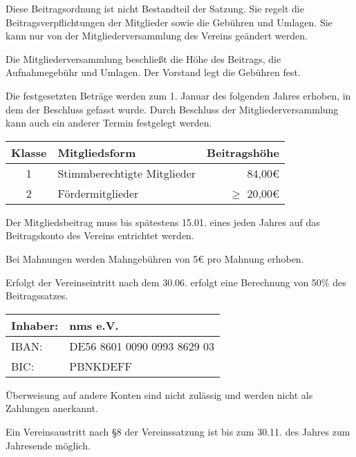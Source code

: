 \begin{beitrag}

  Diese Beitragsordnung ist nicht Bestandteil der Satzung. Sie regelt die Beitragsverpflichtungen der Mitglieder sowie die Gebühren und Umlagen. Sie kann nur von der Mitgliederversammlung des Vereins geändert werden.

  Die Mitgliederversammlung beschließt die Höhe des Beitrags, die Aufnahmegebühr und Umlagen. Der Vorstand legt die Gebühren fest.

  Die festgesetzten Beträge werden zum 1. Januar des folgenden Jahres erhoben, in dem der Beschluss gefasst wurde. Durch Beschluss der Mitgliederversammlung kann auch ein anderer Termin festgelegt werden.


  \begin{center}
    \begin{tabular}{ |c|l|r| }
      \hline
      Klasse & Mitgliedsform               & Beitragshöhe     \\
      \hline \hline
      1      & Stimmberechtigte Mitglieder & 84,00\euro \\
      2      & Fördermitglieder            & $\ge$ 20,00\euro \\
      \hline
    \end{tabular}
  \end{center}

  Der Mitgliedsbeitrag muss bis spätestens 15.01. eines jeden Jahres auf das Beitragskonto des Vereins entrichtet werden.

  Bei Mahnungen werden Mahngebühren von 5\euro{} pro Mahnung erhoben.

  Erfolgt der Vereinseintritt nach dem 30.06. erfolgt eine Berechnung von 50\% des Beitragssatzes.


  \begin{center}
    \begin{tabular}{ |ll| }
      \hline
      Inhaber: & nms e.V.                    \\
      \hline
      IBAN:    & DE56 8601 0090 0993 8629 03 \\
      \hline
      BIC:     & PBNKDEFF                    \\
      \hline
    \end{tabular}
  \end{center}

  Überweisung auf andere Konten sind nicht zulässig und werden nicht als Zahlungen anerkannt.

  Ein Vereinsaustritt nach \S 8 der Vereinssatzung ist bis zum 30.11. des Jahres zum Jahresende möglich.

\end{beitrag}


